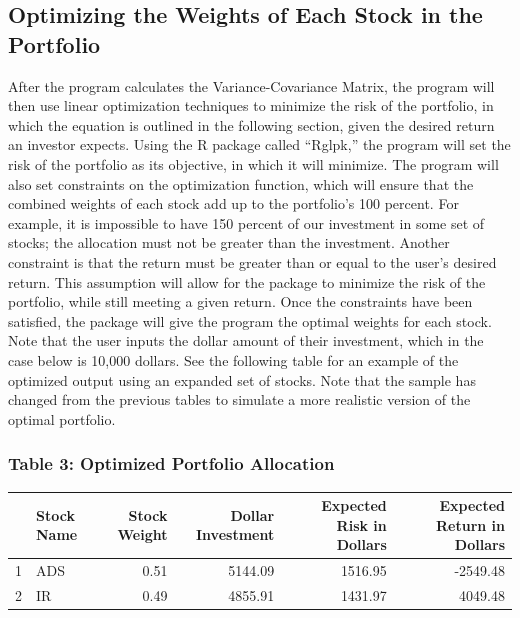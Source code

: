 \documentclass[12pt,english]{article}
\begin{document}
\begin{doublespace}
        \subsection{Optimizing the Weights of Each Stock in the Portfolio}
        
            \indent{}\indent{}
            After the program calculates the Variance-Covariance Matrix, the program will then use linear optimization techniques to minimize the risk of the portfolio, in which the equation is outlined in the following section, given the desired return an investor expects. Using the R package called “Rglpk,” the program will set the risk of the portfolio as its objective, in which it will minimize. The program will also set constraints on the optimization function, which will ensure that the combined weights of each stock add up to the portfolio’s 100 percent. For example, it is impossible to have 150 percent of our investment in some set of stocks; the allocation must not be greater than the investment. Another constraint is that the return must be greater than or equal to the user’s desired return. This assumption will allow for the package to minimize the risk of the portfolio, while still meeting a given return. Once the constraints have been satisfied, the package will give the program the optimal weights for each stock. Note that the user inputs the dollar amount of their investment, which in the case below is 10,000 dollars. See the following table for an example of the optimized output using an expanded set of stocks. Note that the sample has changed from the previous tables to simulate a more realistic version of the optimal portfolio.
            
            \subsubsection{Table 3: Optimized Portfolio Allocation}
                \begin{table}[H]
                \centering
                \begin{tabular}{rlrrrr}
                  \hline
                 & Stock Name & Stock Weight & Dollar Investment & Expected Risk in Dollars & Expected Return in Dollars \\ 
                  \hline
                1 & ADS & 0.51 & 5144.09 & 1516.95 & -2549.48 \\ 
                  2 & IR & 0.49 & 4855.91 & 1431.97 & 4049.48 \\ 
                   \hline
                \end{tabular}
                \end{table}
                

\end{doublespace}
\end{document}
